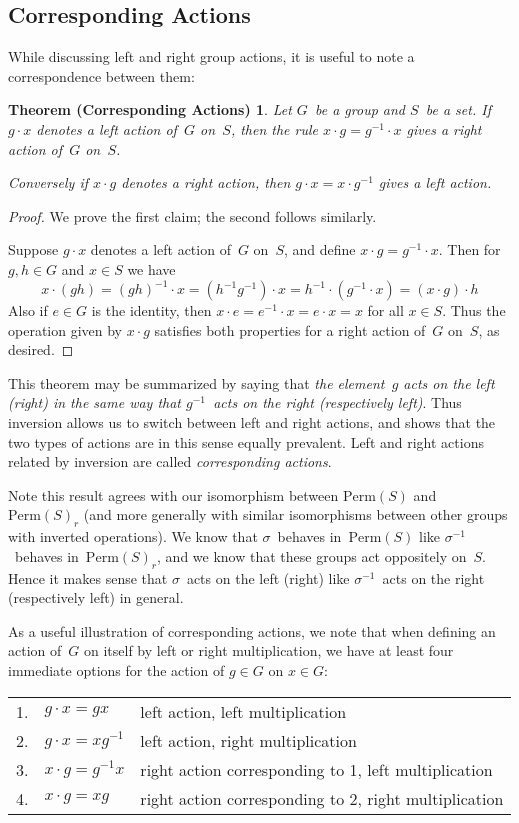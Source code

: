 \documentclass[letterpaper]{article}
\theoremstyle{definition}
\theoremstyle{plain}
\newtheorem*{CA}{Theorem (Corresponding Actions)}
\newcommand{\perm}[1]{\mathrm{Perm}({#1})}
\begin{document}
\subsection*{Corresponding Actions}
While discussing left and right group actions, it is useful to note a correspondence between them:
\begin{CA}
Let $G$~be a group and $S$~be a set. If $g\cdot x$ denotes a left action of~$G$ on~$S$, then the rule $x\cdot g=g^{-1}\cdot x$ gives a right action of~$G$ on~$S$.

Conversely if $x\cdot g$ denotes a right action, then $g\cdot x=x\cdot g^{-1}$ gives a left action.
\end{CA}
\begin{proof}
We prove the first claim; the second follows similarly.

Suppose $g\cdot x$ denotes a left action of~$G$ on~$S$, and define $x\cdot g=g^{-1}\cdot x$. Then for $g,h\in G$ and $x\in S$ we have
$$x\cdot(gh)=(gh)^{-1}\cdot x=(h^{-1}g^{-1})\cdot x=h^{-1}\cdot(g^{-1}\cdot x)=(x\cdot g)\cdot h$$
Also if $e\in G$ is the identity, then $x\cdot e=e^{-1}\cdot x=e\cdot x=x$ for all $x\in S$. Thus the operation given by $x\cdot g$ satisfies both properties for a right action of~$G$ on~$S$, as desired.
\end{proof}
\noindent This theorem may be summarized by saying that \emph{the element~$g$ acts on the left (right) in the same way that $g^{-1}$~acts on the right (respectively left)}. Thus inversion allows us to switch between left and right actions, and shows that the two types of actions are in this sense equally prevalent. Left and right actions related by inversion are called \emph{corresponding actions}.

Note this result agrees with our isomorphism between $\perm{S}$ and $\perm{S}_r$ (and more generally with similar isomorphisms between other groups with inverted operations). We know that $\sigma$~behaves in~$\perm{S}$ like $\sigma^{-1}$~behaves in~$\perm{S}_r$, and we know that these groups act oppositely on~$S$. Hence it makes sense that $\sigma$~acts on the left (right) like $\sigma^{-1}$~acts on the right (respectively left) in general.

As a useful illustration of corresponding actions, we note that when defining an action of~$G$ on itself by left or right multiplication, we have at least four immediate options for the action of $g\in G$ on $x\in G$:

\bigskip
\begin{tabular}{rll}
1.&$g\cdot x=gx$&left action, left multiplication\\
2.&$g\cdot x=xg^{-1}$&left action, right multiplication\\
3.&$x\cdot g=g^{-1}x$&right action corresponding to 1, left multiplication\\
4.&$x\cdot g=xg$&right action corresponding to 2, right multiplication
\end{tabular}
\end{document}
